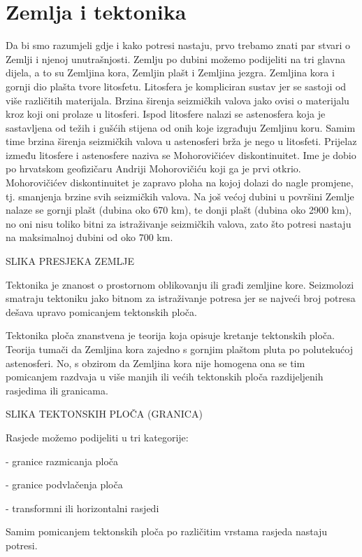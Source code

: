 \documentclass[12pt]{book}
\begin{document}
\section{Zemlja i tektonika}

Da bi smo razumjeli gdje i kako potresi nastaju, prvo trebamo znati par stvari o Zemlji i njenoj unutrašnjosti. Zemlju po dubini možemo podijeliti na tri glavna dijela, a to su Zemljina kora, Zemljin plašt i Zemljina jezgra. Zemljina kora i gornji dio plašta tvore litosfetu. Litosfera je kompliciran sustav jer se sastoji od više različitih materijala. Brzina širenja seizmičkih valova jako ovisi o materijalu kroz koji oni prolaze u litosferi. Ispod litosfere nalazi se astenosfera koja je sastavljena od težih i gušćih stijena od onih koje izgrađuju Zemljinu koru. Samim time brzina širenja seizmičkih valova u astenosferi brža je nego u litosfeti. Prijelaz između litosfere i astenosfere naziva se Mohorovičićev diskontinuitet. Ime je dobio po hrvatskom geofizičaru Andriji Mohorovičiću koji ga je prvi otkrio. Mohorovičićev diskontinuitet je zapravo ploha na kojoj dolazi do nagle promjene, tj. smanjenja brzine svih seizmičkih valova.
Na još većoj dubini u površini Zemlje nalaze se gornji plašt (dubina oko 670 km), te donji plašt (dubina oko 2900 km), no oni nisu toliko bitni za istraživanje seizmičkih valova, zato što potresi nastaju na maksimalnoj dubini od oko 700 km.
 
 SLIKA PRESJEKA ZEMLJE

Tektonika je znanost o prostornom oblikovanju ili građi zemljine kore. Seizmolozi smatraju tektoniku jako bitnom za istraživanje potresa jer se najveći broj potresa dešava upravo pomicanjem tektonskih ploča.


Tektonika ploča znanstvena je teorija koja opisuje kretanje tektonskih ploča. Teorija tumači da Zemljina kora zajedno s gornjim plaštom pluta po polutekućoj astenosferi. No, s obzirom da Zemljina kora nije homogena ona se tim pomicanjem razdvaja u više manjih ili većih tektonskih ploča razdijeljenih rasjedima ili granicama.

SLIKA TEKTONSKIH PLOČA (GRANICA)

Rasjede možemo podijeliti u tri kategorije:

- granice razmicanja ploča

- granice podvlačenja ploča

- transformni ili horizontalni rasjedi

Samim pomicanjem tektonskih ploča po različitim vrstama rasjeda nastaju potresi.
\end{document}
